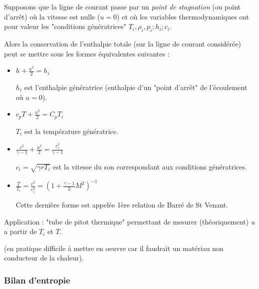 \begin{frame}

\small

Supposons que la ligne de courant passe par un {\em point de stagnation} (ou point d'arrêt) 
où la vitesse est nulle ($u=0$) et où les variables thermodynamiques ont pour valeur les  "conditions génératrices"  $T_i,\rho_i,p_i ; h_i ; c_i$. 
\smallskip
\pause

Alors la conservation de l'enthalpie totale (sur la ligne de courant considérée) 
peut se mettre sous les formes équivalentes suivantes :
\pause
\medskip
\begin{itemize}

\item $ h + \frac{u^2}{2} = h_i$ 

$h_i$ est l'enthalpie génératrice (enthalpie d'un "point d'arrêt" de l'écoulement où $u=0$).
\pause
\item $c_p T + \frac{u^2}{2} = C_p T_i$

 $T_i$ est la température génératrice.
\pause
\item $\frac{c^2}{\gamma-1} + \frac{u^2}{2}  = \frac{c_i^2}{\gamma-1}$

$c_i = \sqrt{\gamma r T_i}$ est la vitesse du son correspondant aux conditions génératrices.
\pause
\item $\frac{T}{T_i} = \frac{c^2}{c_i^2} = \left( 1 + \frac{\gamma-1}{2} M^2 \right)^{-1}$

Cette dernière forme est appelée 1ère relation de Barré de St Venant. 

\end{itemize}

\pause
\bigskip
Application : "tube de pitot thermique" permettant de mesurer (théoriquement) $u$ a partir de $T_i$ et $T$.

{\textcolor{gris} (en pratique difficile à mettre en oeuvre car il faudrait un matériau non conducteur de la chaleur).}


\end{frame}

\subsubsection{Bilan d'entropie}

